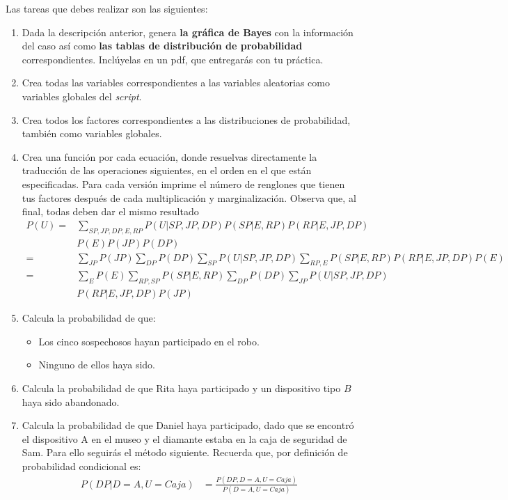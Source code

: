 Las tareas que debes realizar son las siguientes:
\begin{enumerate}
 \item Dada la descripción anterior, genera \textbf{la gráfica de Bayes} con la información del caso así como \textbf{las tablas de distribución de probabilidad} correspondientes.  Inclúyelas en un pdf, que entregarás con tu práctica.

 \item Crea todas las variables correspondientes a las variables aleatorias como variables globales del \textit{script}.
 
 \item Crea todos los factores correspondientes a las distribuciones de probabilidad, también como variables globales.
 
 \item Crea una función por cada ecuación, donde resuelvas directamente la traducción de las operaciones siguientes, en el orden en el que están especificadas.  Para cada versión imprime el número de renglones que tienen tus factores después de cada multiplicación y marginalización. Observa que, al final, todas deben dar el mismo resultado
 \begin{align}
  P(U) %
       =& \sum_{SP,JP,DP,E,RP}P(U|SP,JP,DP)P(SP|E,RP)P(RP|E,JP,DP) \\
        & P(E)P(JP)P(DP) \nonumber \\
       =& \sum_{JP}P(JP)\sum_{DP}P(DP)\sum_{SP}P(U|SP,JP,DP)\sum_{RP,E}P(SP|E,RP)P(RP|E,JP,DP)P(E) \nonumber \\
       =& \sum_{E}P(E) \sum_{RP,SP}P(SP|E,RP) \sum_{DP}P(DP) \sum_{JP}P(U|SP,JP,DP) \nonumber \\
        & P(RP|E,JP,DP)P(JP) \nonumber
 \end{align}
 
 \item Calcula la probabilidad de que:
 \begin{itemize}
  \item Los cinco sospechosos hayan participado en el robo.
  \item Ninguno de ellos haya sido.
 \end{itemize}

 \item Calcula la probabilidad de que Rita haya participado y un dispositivo tipo $B$ haya sido abandonado.
 
 \item Calcula la probabilidad de que Daniel haya participado, dado que se encontró el dispositivo A en el museo y el diamante estaba en la caja de seguridad de Sam.  Para ello seguirás el método siguiente.
 Recuerda que, por definición de probabilidad condicional es:
 \begin{align*}
   P(DP|D=A,U=Caja) &= \frac{P(DP,D=A,U=Caja)}{P(D=A,U=Caja)}
 \end{align*}
  

\end{enumerate}
